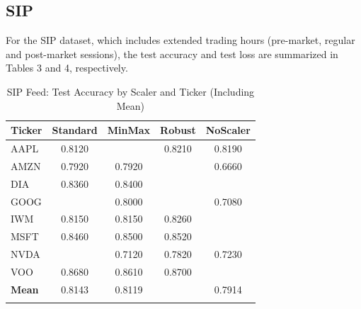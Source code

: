 \documentclass[10pt,a4paper]{article}
\begin{document}
\subsection{SIP}

For the SIP dataset, which includes extended trading hours (pre-market, regular and post-market sessions), the test accuracy and test loss are summarized in Tables 3 and 4, respectively.


\begin{table}[H]
\centering
{}
\caption{SIP Feed: Test Accuracy by Scaler and Ticker (Including Mean)}
\begin{tabular}{lcccc}
\toprule
\textbf{Ticker} & \textbf{Standard} & \textbf{MinMax} & \textbf{Robust} & \textbf{NoScaler} \\
\midrule
AAPL  & 0.8120 & \cellcolor{lightgreen}{0.8250} & 0.8210 & 0.8190 \\
AMZN  & 0.7920 & 0.7920 & \cellcolor{lightgreen}{0.8070} & 0.6660 \\
DIA   & 0.8360 & 0.8400 & \cellcolor{lightgreen}{0.8420} & \cellcolor{lightgreen}{0.8420} \\
GOOG  & \cellcolor{lightgreen}{0.8160} & 0.8000 & \cellcolor{lightgreen}{0.8160} & 0.7080 \\
IWM   & 0.8150 & 0.8150 & 0.8260 & \cellcolor{lightgreen}{0.8340} \\
MSFT  & 0.8460 & 0.8500 & 0.8520 & \cellcolor{lightgreen}{0.8610} \\
NVDA  &\cellcolor{lightgreen}{0.7290} & 0.7120 & 0.7820 & 0.7230 \\
VOO   & 0.8680 & 0.8610 & 0.8700 & \cellcolor{lightgreen}{0.8780} \\
\midrule
\textbf{Mean} & 0.8143 & 0.8119 & \cellcolor{lightgreen}{0.8201} & 0.7914 \\
\bottomrule
\label{tab:sip_accuracy}
\end{tabular}
\end{table}
\end{document}
